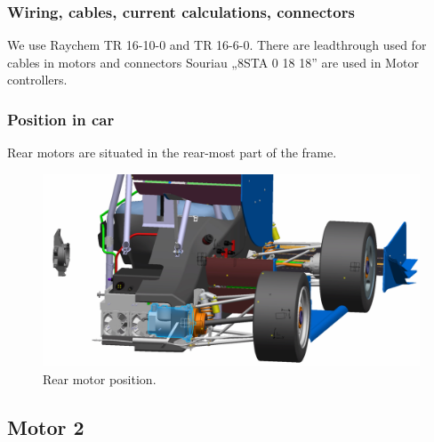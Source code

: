 \subsubsection{Wiring, cables, current calculations, connectors}
We use Raychem TR 16-10-0 and TR 16-6-0. There are leadthrough used for cables in motors and connectors Souriau „8STA 0 18 18” are used in Motor controllers.

\subsubsection{Position in car}

Rear motors are situated in the rear-most part of the frame. 

\begin{figure}[H]
	\centering
	\includegraphics[width=\textwidth]{./img/Motor-rear-position.jpg}
	\caption{Rear motor position.}
	\label{fig:Motor-rear-position}
\end{figure}

\subsection{Motor 2}%

